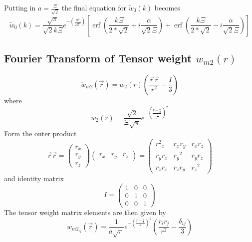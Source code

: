 \documentclass[letterpaper,twocolumn,amsmath,amssymb,prb]{revtex4-1}
\begin{document}
\begin{widetext}
\[{}\] %
Putting in $a=\frac{\Xi}{\sqrt{2}}$ the final equation for $\widetilde{w}_0(k)$ becomes
\begin{equation}{\widetilde{w}_0(k)=\frac{\sqrt{\pi}}{\sqrt{2}k\Xi}e^{-\left(\frac{\alpha^2}{2\Xi^2}\right)}\left[\operatorname{erf}\left(\frac{k\Xi}{2*\sqrt{2}}+i\frac{\alpha}{\sqrt{2}\Xi}\right)+\operatorname{erf}\left(\frac{k\Xi}{2*\sqrt{2}}-i\frac{\alpha}{\sqrt{2}\Xi}\right)\right]}\end{equation}
\color{black}
\[{}\]


\subsection{Fourier Transform of Tensor weight ${w}_{m2}(r)$} %
\begin{equation}{\overleftrightarrow{w}_{m2}(\vec{r})=w_2(r)\left(\frac{\vec{r}\vec{r}}{r^2}-\frac{I}{3}\right)}\end{equation}
where
\begin{equation}{w_2(r)=\frac{\sqrt{2}}{\Xi\sqrt{\pi}}e^{-\left(\frac{r-\frac{\alpha}{2}}{\frac{\Xi}{\sqrt{2}}}\right)^2}}\end{equation}
Form the outer product
\begin{equation}{\vec{r}\vec{r}=\left(\begin{array}{c} r_x \\ r_y \\ r_z \end{array} \right) \left(\begin{array}{rrr} r_x & r_y & r_z \end{array} \right)=\left(\begin{array}{ccc} {r^2}_x & r_xr_y & r_xr_z \\ r_yr_x & {r_y}^2 & r_yr_z \\ r_zr_x & r_zr_y & {r_z}^2 \end{array}\right)}\end{equation}
and identity matrix
\begin{equation}{I=\left(\begin{array}{ccc} 1 & 0 & 0 \\ 0 & 1 & 0 \\ 0 & 0 & 1 \end{array}\right)}\end{equation}
The tensor weight matrix elements are then given by
\begin{equation}{w_{m2_{ij}}(\vec{r})=\frac{1}{a\sqrt{\pi}}e^{-\left(\frac{r-\frac{\alpha}{2}}{a}\right)^2}\left(\frac{r_ir_j}{r^2}-\frac{\delta_{ij}}{3}\right)}\end{equation}

\end{widetext}
\end{document}

